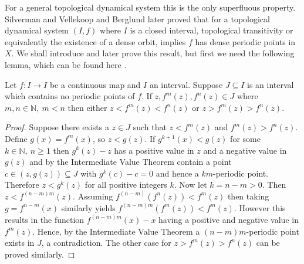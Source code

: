 For a general topological dynamical system this is the only superfluous property. Silverman \cite{silverman} and Vellekoop and Berglund \cite{vellekoop-berglund} later proved that for a topological dynamical system $(I, f)$ where $I$ is a closed interval, topological transitivity or equivalently the existence of a dense orbit, implies $f$ has dense periodic points in $X$. We shall introduce and later prove this result, but first we need the following lemma, which can be found here \cite[\S 4.1]{block-coppel}.

\begin{lem} \label{lem:closed-interval-no-periodic-points}
    Let $f: I \to I$ be a continuous map and $I$ an interval. Suppose $J \subseteq I$ is an interval which contains no periodic points of $f$. If $z, f^m(z), f^n(z) \in J$ where $m, n \in \mathbb{N}, \ m < n$ then either $z < f^m(z) < f^n(z)$ or $z > f^m(z) > f^n(z)$.
    \begin{proof}
        Suppose there exists a $z \in J$ such that $z < f^m(z)$ and $f^m(z) > f^n(z)$. Define $g(x) = f^m(x)$, so $z < g(z)$. If $g^{k+1}(x) < g(z)$ for some $k \in \mathbb{N}, \ n \geq 1$ then $g^k(z) - z$ has a positive value in $z$ and a negative value in $g(z)$ and by the Intermediate Value Theorem contain a point $c \in (z, g(z)) \subseteq J$ with $g^k(c) - c = 0$ and hence a $km$-periodic point. Therefore $z < g^k(z)$ for all positive integers $k$. Now let $k = n - m > 0$. Then $z < f^{(n - m)m}(z)$. Assuming $f^{(n-m)}(f^n(z)) < f^m(z)$ then taking $g = f^{n-m}(x)$ similarly yields $f^{(n-m)m}(f^m(z)) < f^m(z)$. However this results in the function $f^{(n-m)m}(x) - x$ having a positive and negative value in $f^m(z)$. Hence, by the Intermediate Value Theorem a $(n-m)m$-periodic point exists in $J$, a contradiction. The other case for $z > f^m(z) > f^n(z)$ can be proved similarly.
    \end{proof}
\end{lem}

